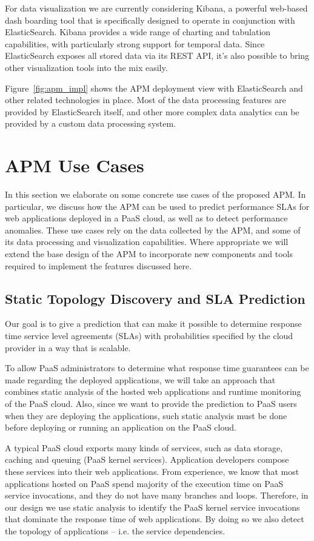 \documentclass[11pt]{article}
\begin{document}
For data visualization we are currently considering Kibana, a powerful web-based dash boarding tool 
that is specifically designed to operate in conjunction with ElasticSearch. Kibana provides a wide
range of charting and tabulation capabilities, with particularly strong support for temporal data.  Since
ElasticSearch exposes all stored data via its REST API, it's also possible to bring other visualization
tools into the mix easily.

Figure~\ref{fig:apm_impl} shows the APM deployment view with ElasticSearch and other related technologies
in place. Most of the data processing features are provided by ElasticSearch itself, and other more complex
data analytics can be provided by a custom data processing system. 

\section{APM Use Cases}
In this section we elaborate on some concrete use cases of the proposed APM. In particular, we discuss how
the APM can be used to predict performance SLAs for web applications deployed in a PaaS cloud, as well
as to detect performance anomalies. These use cases rely on the data collected by the APM, and some
of its data processing and visualization capabilities. Where appropriate we will extend the base design
of the APM to incorporate new components and tools required to implement the features discussed here.

\subsection{Static Topology Discovery and SLA Prediction}
Our goal is to give a prediction that can make it possible to determine response time service level agreements (SLAs)
with probabilities specified by the cloud provider in a way that is scalable.

To allow PaaS administrators to determine what response time guarantees can be made
regarding the deployed applications,
we will take an approach that combines static analysis of the hosted web applications and runtime monitoring of the PaaS cloud. 
Also, since we want to provide the prediction to PaaS users when they are deploying the applications,
such static analysis must be done before deploying or running an application on the PaaS cloud. 

A typical PaaS cloud exports many kinds of services, such as data storage, caching and queuing (PaaS kernel
services). Application developers
compose these services into their web applications. 
From experience, we know that most applications hosted on PaaS spend majority of
the execution time on PaaS service invocations, and they do not have many branches and loops. Therefore, in our design we use
static analysis to identify the PaaS kernel service invocations that dominate the response time of web applications.
By doing so we also detect the topology of applications -- i.e. the service dependencies.
\end{document}
